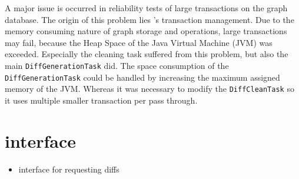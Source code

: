 	A major issue is occurred in reliability tests of large transactions on the graph database. The origin of this problem lies \neoj's transaction management. Due to the memory consuming nature of graph storage and operations, large transactions may fail, because the Heap Space of the Java Virtual Machine (JVM) was exceeded. Especially the cleaning task suffered from this problem, but also the main \texttt{DiffGenerationTask} did.
	The space consumption of the \texttt{DiffGenerationTask} could be handled by increasing the maximum assigned memory of the JVM. Whereas it was necessary to modify the \texttt{DiffCleanTask} so it uses multiple smaller transaction per pass through.
	
	\begin{comment}
	\begin{itemize}
		\item interaction with \bives and neo4j
		\item problems with Transaction rollback in actually successfull transactions
		\item trigger for generating diffs for new versions
	\end{itemize}
	\end{comment}

\section{\rest interface}
	\label{sec:impl:rest}
	\begin{itemize}
		\item \rest interface for requesting diffs
	\end{itemize}

